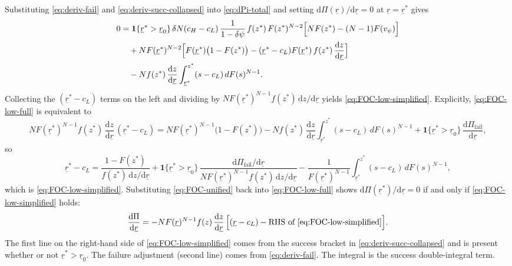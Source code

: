 Substituting \eqref{eq:deriv-fail} and \eqref{eq:deriv-succ-collapsed} into
\eqref{eq:dPi-total} and setting $\mathrm d\Pi(\underline{r})/\mathrm d\underline{r}=0$
at $\underline{r}=\underline{r}^{*}$ gives
\begin{align}
  0
  &= \mathbf{1}\{\underline{r}^{*}>\underline{r}_0\}\,
    \delta N (c_H - c_L)\,
    \frac{1}{1 - \delta \psi}\,
    f(z^{*})\, F(z^{*})^{N-2}
    \Bigl[
      N F(z^{*})
      - (N-1) F(v_{\psi})
    \Bigr]
  \notag\\
  &\quad + N F(\underline{r}^{*})^{N-2}
    \Bigl[
      F(\underline{r}^{*})\bigl(1 - F(z^{*})\bigr)
      - (\underline{r}^{*} - c_L) F(\underline{r}^{*})\,
        f(z^{*})\,
        \frac{\mathrm dz}{\mathrm d\underline{r}}
    \Bigr]
  \notag\\
  &\quad - N f(z^{*})\,
    \frac{\mathrm dz}{\mathrm d\underline{r}}
    \int_{\underline{r}^{*}}^{z^{*}}
      (s - c_L)\, dF(s)^{N-1}.
  \label{eq:FOC-low-full}
\end{align}
Collecting the $(\underline{r}^{*}-c_L)$ terms on the left and dividing by
$N F(\underline{r}^{*})^{N-1} f(z^{*})\,\mathrm dz/\mathrm d\underline{r}$
yields \eqref{eq:FOC-low-simplified}.
Explicitly, \eqref{eq:FOC-low-full} is equivalent to
\begin{equation}
  N F(\underline{r}^{*})^{N-1} f(z^{*})\,
    \frac{\mathrm dz}{\mathrm d\underline{r}}\,
    (\underline{r}^{*} - c_L)
  = N F(\underline{r}^{*})^{N-1}\bigl(1 - F(z^{*})\bigr)
    - N f(z^{*})\,
      \frac{\mathrm dz}{\mathrm d\underline{r}}
      \int_{\underline{r}^{*}}^{z^{*}}
        (s - c_L)\, dF(s)^{N-1}
    + \mathbf{1}\{\underline{r}^{*}>\underline{r}_0\}\,
      \frac{\mathrm d\Pi_{\text{fail}}}{\mathrm d\underline{r}},
  \label{eq:FOC-collect-r}
\end{equation}
so
\begin{equation}
  \underline{r}^{*} - c_L
  = \frac{1 - F(z^{*})}{f(z^{*})\,\mathrm dz/\mathrm d\underline{r}}
    + \mathbf{1}\{\underline{r}^{*}>\underline{r}_0\}\,
      \frac{
        \mathrm d\Pi_{\text{fail}}/\mathrm d\underline{r}
      }{
        N F(\underline{r}^{*})^{N-1} f(z^{*})\,
          \mathrm dz/\mathrm d\underline{r}
      }
    - \frac{1}{F(\underline{r}^{*})^{N-1}}
      \int_{\underline{r}^{*}}^{z^{*}}
        (s - c_L)\, dF(s)^{N-1},
  \label{eq:FOC-unified}
\end{equation}
which is \eqref{eq:FOC-low-simplified}.
Substituting \eqref{eq:FOC-unified} back into \eqref{eq:FOC-low-full} shows
$\mathrm d\Pi(\underline{r}^{*})/\mathrm d\underline{r}=0$ if and only if
\eqref{eq:FOC-low-simplified} holds:
\begin{equation}
  \frac{\mathrm d\Pi}{\mathrm d\underline{r}}
  = -N F(\underline{r})^{N-1} f(z)\,
    \frac{\mathrm dz}{\mathrm d\underline{r}}\,
    \Bigl[
      (\underline{r} - c_L) - \text{RHS of \eqref{eq:FOC-low-simplified}}
    \Bigr].
  \label{eq:FOC-residual}
\end{equation}
The first line on the right-hand side of \eqref{eq:FOC-low-simplified} comes
from the success bracket in \eqref{eq:deriv-succ-collapsed} and is present
whether or not $\underline{r}^{*}>\underline{r}_0$.
The failure adjustment (second line) comes from \eqref{eq:deriv-fail}.
The integral is the success double-integral term.

